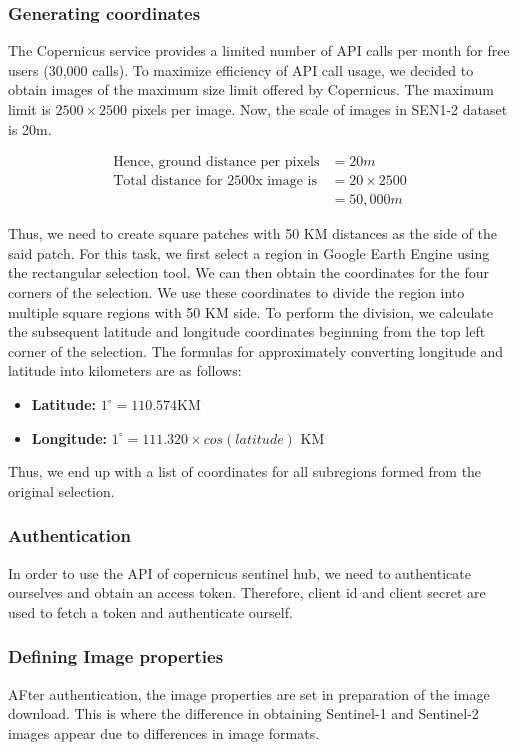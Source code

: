 \subsubsection{Generating coordinates}
The Copernicus service provides a limited number of API calls per month for free users (30,000 calls). To maximize efficiency of API call usage, we decided to obtain images of the maximum size limit offered by Copernicus. The maximum limit is $2500\times2500$ pixels per image. Now, the scale of images in SEN1-2 dataset is 20m.

\begin{align*}
    \text{Hence, ground distance per pixels} &= 20m \\
    \text{Total distance for 2500x image is} &= 20\times2500 \\
    &= 50,000m
\end{align*}

Thus, we need to create square patches with 50 KM distances as the side of the said patch. For this task, we first select a region in Google Earth Engine using the rectangular selection tool. We can then obtain the coordinates for the four corners of the selection. We use these coordinates to divide the region into multiple square regions with 50 KM side. To perform the division, we calculate the subsequent latitude and longitude coordinates beginning from the top left corner of the selection. The formulas for approximately converting longitude and latitude into kilometers are as follows:

\begin{itemize}
    \item \textbf{Latitude: } $1^\circ = 110.574$KM
    \item \textbf{Longitude:} $1^\circ = 111.320\times cos(latitude)$ KM
\end{itemize}

Thus, we end up with a list of coordinates for all subregions formed from the original selection.

\subsubsection{Authentication} \label{CopeAuth}
In order to use the API of copernicus sentinel hub, we need to authenticate ourselves and obtain an access token. Therefore, client id and client secret are used to fetch a token and authenticate ourself.

\subsubsection{Defining Image properties} \label{CopImgProp}
AFter authentication, the image properties are set in preparation of the image download. This is where the difference in obtaining Sentinel-1 and Sentinel-2 images appear due to differences in image formats.

